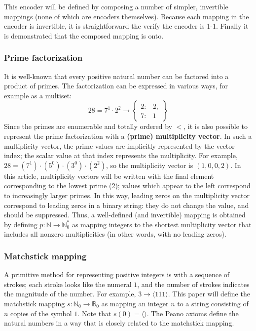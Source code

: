 \documentclass[12pt,reqno]{article}
\begin{document}
This encoder will be defined by composing a number of simpler, invertible mappings (none of which are encoders themselves). Because each mapping in the encoder is invertible, it is straightforward the verify the encoder is 1-1. Finally it is demonstrated that the composed mapping is onto.

\subsubsection{Prime factorization}

It is well-known that every positive natural number can be factored into a product of primes. The factorization can be expressed in various ways, for example as a multiset:
\begin{equation}
28 = 7^1 \cdot 2^2 \rightarrow \begin{Bmatrix}
        2: & 2, \\
        7: & 1
    \end{Bmatrix}
\end {equation}
Since the primes are enumerable and totally ordered by $<$, it is also possible to represent the prime factorization with a \textbf{(prime) multiplicity vector}. In such a multiplicity vector, the prime values are implicitly represented by the vector index; the scalar value at that index represents the multiplicity. For example, $28 = (7^1) \cdot (5^0) \cdot (3^0) \cdot (2^2)$, so the multiplicity vector is $(1, 0, 0, 2)$. In this article, multiplicity vectors will be written with the final element corresponding to the lowest prime (2); values which appear to the left correspond to increasingly larger primes. In this way, leading zeros on the multiplicity vector correspond to leading zeros in a binary string: they do not change the value, and should be suppressed. Thus, a well-defined (and invertible) mapping is obtained by defining $p : \mathbb{N} \rightarrow \mathbb{N}_0^{*}$ as mapping integers to the shortest multiplicity vector that includes all nonzero multiplicities (in other words, with no leading zeros).

\subsubsection{Matchstick mapping}

A primitive method for representing positive integers is with a sequence of strokes; each stroke looks like the numeral $1$, and the number of strokes indicates the magnitude of the number. For example, $3 \rightarrow \langle 111 \rangle$. This paper will define the matchstick mapping $s : \mathbb{N}_0 \rightarrow \mathbb{B}_0$ as mapping an integer $n$ to a string consisting of $n$ copies of the symbol $1$. Note that $s(0) = \langle \rangle$. The Peano axioms define the natural numbers in a way that is closely related to the matchstick mapping.
\end{document}
